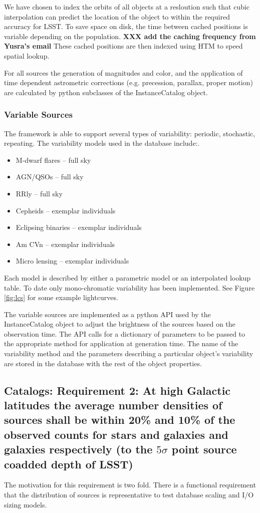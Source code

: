 \documentclass[]{article}
\begin{document}
{We have chosen to index the orbits of all objects at a resloution such that cubic interpolation can predict the location of the
object to within the required accuracy for LSST. To save space on disk, the time between cached positions is variable depending on 
the population. {\bf XXX add the caching frequency from Yusra's email}
These cached positions are then indexed using HTM to speed spatial lookup.

For all sources the generation of magnitudes and color, and the application of time dependent astrometric corrections (e.g. 
precession, parallax, proper motion) are calculated by python subclasses of the InstanceCatalog object.

\subsubsection{Variable Sources}
The framework is able to support several types of variability: periodic, stochastic, repeating.
The variability models used in the database include:.  
\begin{itemize}
\item M-dwarf flares -- full sky
\item AGN/QSOs -- full sky
\item RRly -- full sky
\item Cepheids -- exemplar individuals
\item Eclipsing binaries -- exemplar individuals
\item Am CVn -- exemplar individuals
\item Micro lensing -- exemplar individuals
\end{itemize}
Each model is described by either a parametric model or an interpolated lookup table.  To date only mono-chromatic variability has been implemented.
See Figure \ref{fig:lcs} for some example lightcurves.

The variable sources are implemented as a python API used by the InstanceCatalog object to adjust the brightness of the sources based on the observation time.
The API calls for a dictionary of parameters to be passed to the appropriate method for application at generation time.  The name of the variability method and
the parameters describing a particular object's variability are stored in the database with the rest of the object properties.

\subsection{Catalogs: Requirement 2: At high Galactic latitudes the
  average number densities of sources shall be within 20\%
  and 10\% 
  of the observed counts for stars and galaxies and galaxies
  respectively (to the $5\sigma$ point source coadded depth
  of LSST)}
The motivation for this requirement is two fold.  There is a functional requirement that the distribution of sources is representative
to test database scaling and I/O sizing models.  

}
\end{document}
